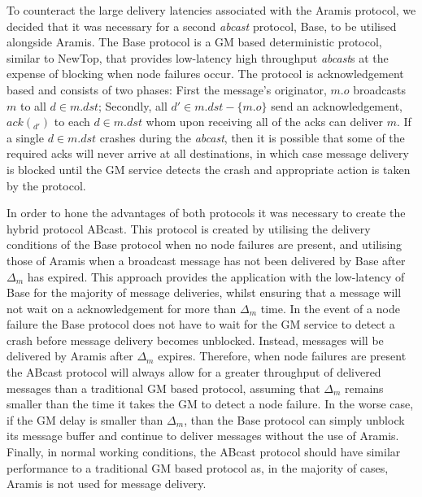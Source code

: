     To counteract the large delivery latencies associated with the \textsf{Aramis} protocol, we decided that it was necessary for a second \emph{abcast} protocol, \textsf{Base}, to be utilised alongside \textsf{Aramis}.  The \textsf{Base} protocol is a GM based deterministic protocol, similar to NewTop\citep{Ezhilchelvan:1995:NFG:876885.880005}, that provides low-latency high throughput \emph{abcast}s at the expense of blocking when node failures occur. The protocol is acknowledgement based and consists of two phases: First the message's originator, $m.o$ broadcasts $m$ to all $d \in m.dst$; Secondly, all $d' \in m.dst - \{m.o\}$ send an acknowledgement, $ack(_{d'})$  to each $d \in m.dst$ whom upon receiving all of the acks can deliver $m$.  If a single $d \in m.dst$ crashes during the \emph{abcast},  then it is possible that some of the required acks will never arrive at all destinations, in which case message delivery is blocked until the GM service detects the crash and appropriate action is taken by the protocol.  
    
    In order to hone the advantages of both protocols it was necessary to create the hybrid protocol \textsf{ABcast}.  This protocol is created by utilising the delivery conditions of the \textsf{Base} protocol when no node failures are present, and utilising those of \textsf{Aramis} when a broadcast message has not been delivered by \textsf{Base} after $\Delta_m$ has expired.  This approach provides the application with the low-latency of \textsf{Base} for the majority of message deliveries, whilst ensuring that a message will not wait on a acknowledgement for more than $\Delta_m$ time.  In the event of a node failure the \textsf{Base} protocol does not have to wait for the GM service to detect a crash before message delivery becomes unblocked.  Instead, messages will be delivered by \textsf{Aramis} after $\Delta_m$ expires.  Therefore, when node failures are present the \textsf{ABcast} protocol will always allow for a greater throughput of delivered messages than a traditional GM based protocol, assuming that $\Delta_m$ remains smaller than the time it takes the GM to detect a node failure.  In the worse case, if the GM delay is smaller than $\Delta_m$, than the \textsf{Base} protocol can simply unblock its message buffer and continue to deliver messages without the use of \textsf{Aramis}.  Finally, in normal working conditions, the \textsf{ABcast} protocol should have similar performance to a traditional GM based protocol as, in the majority of cases, \textsf{Aramis} is not used for message delivery.  

